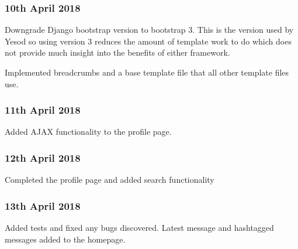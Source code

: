 \subsubsection{10th April 2018}
Downgrade Django bootstrap version to bootstrap 3. This is the version used by Yesod so using
version 3 reduces the amount of template work to do which does not provide much insight
into the benefits of either framework.

Implemented breadcrumbs and a base template file that all other template files use.

\subsubsection{11th April 2018}
Added AJAX functionality to the profile page.

\subsubsection{12th April 2018}
Completed the profile page and added search functionality

\subsubsection{13th April 2018}
Added tests and fixed any bugs discovered. Latest message and hashtagged messages added to the homepage.
